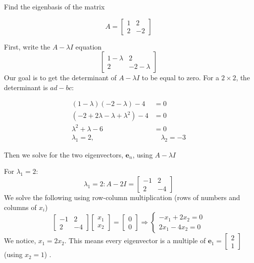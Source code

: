 \begin{Exercise}[title={A $2\times 2$ matrix}, label={ex:2x2}]

Find the eigenbasis of the matrix 

$$A = \begin{bmatrix}
1 & 2 \\
2 & -2
\end{bmatrix}$$

\end{Exercise}
\begin{Answer}[ref={ex:2x2}]

First, write the $A-\lambda I$ equation
$$\begin{bmatrix}
1-\lambda & 2 \\
2 & -2-\lambda
\end{bmatrix}$$
Our goal is to get the determinant of $A-\lambda I$ to be equal to zero. For a $2\times 2$, the determinant is $ad-bc$:

\begin{align*}
(1 - \lambda)(-2 - \lambda) - 4 &= 0 \\
(-2 + 2\lambda - \lambda + \lambda^2) - 4 &= 0 \\
\lambda^2 + \lambda - 6 &= 0 \\
\lambda_1 = 2, &\quad \lambda_2 = -3
\end{align*}

Then we solve for the two eigenvectors, $\mathbf e_n$, using $A-\lambda I$ 

For $\lambda_1=2$:
$$\lambda_1 = 2:
A - 2I = 
\begin{bmatrix}
-1 & 2 \\
2 & -4
\end{bmatrix}
$$
We solve the following using row-column multiplication (rows of numbers and columns of $x_i$) 
$$
\begin{bmatrix}
-1 & 2 \\
2 & -4
\end{bmatrix}
\begin{bmatrix}
x_1 \\ x_2
\end{bmatrix}
= 
\begin{bmatrix}
0 \\ 0
\end{bmatrix}
\Rightarrow
\begin{cases}
- x_1 + 2x_2 = 0 \\
2x_1 - 4x_2 = 0
\end{cases}
$$
We notice, $x_1=2x_2$. This means every eigenvector is a multiple of $\mathbf e_{1}=\begin{bmatrix}2 \\ 1\end{bmatrix}$ (using $x_2=1$) .


\end{Answer}
